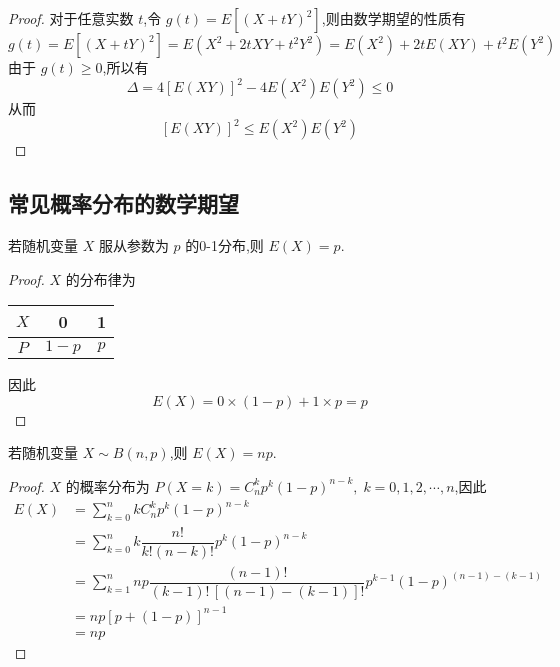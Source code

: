 \begin{proof}
    对于任意实数 $t$,令 $g(t) = E[(X+tY)^2]$,则由数学期望的性质有
    $$
    g(t) = E[(X+tY)^2] = E(X^2 + 2tXY + t^2 Y^2) = E(X^2) + 2tE(XY) + t^2 E(Y^2)
    $$
    由于 $g(t) \geqslant 0$,所以有
    $$
    \varDelta = 4 [E(XY)]^2 - 4 E(X^2) E(Y^2) \leqslant 0
    $$
    从而
    $$
    [E(XY)]^2 \leqslant E(X^2) E(Y^2)
    $$
\end{proof}

\subsection{常见概率分布的数学期望}

\begin{conclusion}
    \indent 若随机变量 $X$ 服从参数为 $p$ 的0-1分布,则 $E(X) = p$.
\end{conclusion}

\begin{proof}
    $X$ 的分布律为

    \begin{center}
        \begin{tabular}{c | c c}
            \hline
            $X$ & 0 & 1 \\
            \hline
            $P$ & $1-p$ & $p$ \\
            \hline
        \end{tabular}
    \end{center}

    因此
    $$
    E(X) = 0 \times (1-p) + 1 \times p = p
    $$
\end{proof}

\begin{conclusion}
    \indent 若随机变量 $X \sim B(n,p)$,则 $E(X) = np$.
\end{conclusion}

\begin{proof}
    $X$ 的概率分布为 $P(X=k) = C_n^k p^k (1-p)^{n-k}, \; k=0,1,2,\cdots,n$,因此
    $$
    \begin{aligned}
        E(X) &= \sum_{k=0}^n k C_n^k p^k (1-p)^{n-k} \\
        &= \sum_{k=0}^n k \dfrac{n!}{k! (n-k)!} p^k (1-p)^{n-k} \\
        &= \sum_{k=1}^n np \dfrac{(n-1)!}{(k-1)! \, [(n-1)-(k-1)]!} p^{k-1} (1-p)^{(n-1)-(k-1)} \\
        &= np[p+(1-p)]^{n-1} \\
        &= np
    \end{aligned}
    $$
\end{proof}

